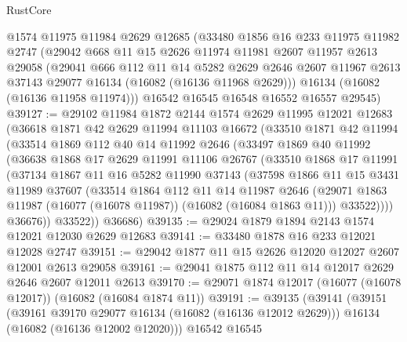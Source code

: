 \begin{lexlean}{RustCore}
\begin{coremodule}
    @1574
    @11975
    @11984
    @2629
    @12685
    (@33480
      @1856
      @16
      @233
      @11975
      @11982
      @2747
      (@29042
        @668
        @11
        @15
        @2626
        @11974
        @11981
        @2607
        @11957
        @2613
        @29058
        (@29041
          @666
          @112
          @11
          @14
          @5282
          @2629
          @2646
          @2607
          @11967
          @2613
          @37143
          @29077
          @16134
          (@16082 (@16136 @11968 @2629)))
        @16134
        (@16082 (@16136 @11958 @11974)))
      @16542
      @16545
      @16548
      @16552
      @16557
      @29545)
@39127 := @29102
    @11984
    @1872
    @2144
    @1574
    @2629
    @11995
    @12021
    @12683
    (@36618
      @1871
      @42
      @2629
      @11994
      @11103
      @16672
      (@33510
        @1871
        @42
        @11994
        (@33514
          @1869
          @112
          @40
          @14
          @11992
          @2646
          (@33497
            @1869
            @40
            @11992
            (@36638
              @1868
              @17
              @2629
              @11991
              @11106
              @26767
              (@33510
                @1868
                @17
                @11991
                (@37134
                  @1867
                  @11
                  @16
                  @5282
                  @11990
                  @37143
                  (@37598
                    @1866
                    @11
                    @15
                    @3431
                    @11989
                    @37607
                    (@33514
                      @1864
                      @112
                      @11
                      @14
                      @11987
                      @2646
                      (@29071 @1863 @11987 (@16077 (@16078 @11987)) (@16082 (@16084 @1863 @11)))
                      @33522))))
              @36676))
          @33522))
      @36686)
@39135 := @29024 @1879 @1894 @2143 @1574 @12021 @12030 @2629 @12683
@39141 := @33480 @1878 @16 @233 @12021 @12028 @2747
@39151 := @29042 @1877 @11 @15 @2626 @12020 @12027 @2607 @12001 @2613 @29058
@39161 := @29041 @1875 @112 @11 @14 @12017 @2629 @2646 @2607 @12011 @2613
@39170 := @29071 @1874 @12017 (@16077 (@16078 @12017)) (@16082 (@16084 @1874 @11))
@39191 := @39135
    (@39141
      (@39151
        (@39161 @39170 @29077 @16134 (@16082 (@16136 @12012 @2629)))
        @16134
        (@16082 (@16136 @12002 @12020)))
      @16542
      @16545

\end{coremodule}
\end{lexlean}

